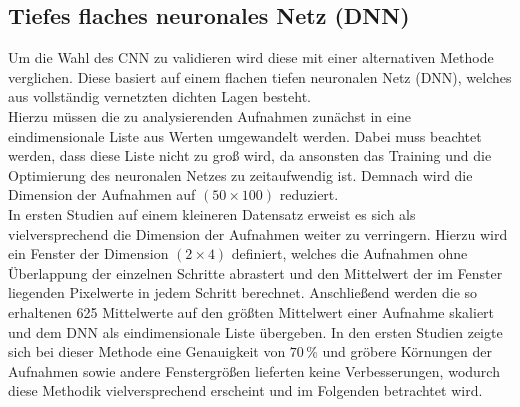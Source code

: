 \subsection{Tiefes flaches neuronales Netz (DNN)}

Um die Wahl des CNN zu validieren wird diese mit einer alternativen Methode verglichen. Diese basiert auf einem flachen tiefen neuronalen Netz (DNN), welches aus vollständig vernetzten dichten Lagen besteht. \\
Hierzu müssen die zu analysierenden Aufnahmen zunächst in eine eindimensionale Liste aus Werten umgewandelt werden. Dabei muss beachtet werden, dass diese Liste nicht zu gro{\ss} wird, da ansonsten das Training und die Optimierung des neuronalen Netzes zu zeitaufwendig ist. Demnach wird die Dimension der Aufnahmen auf $(50\times 100)$ reduziert.\\
In ersten Studien auf einem kleineren Datensatz erweist es sich als vielversprechend die Dimension der Aufnahmen weiter zu verringern. Hierzu wird ein Fenster der Dimension $(2\times 4)$ definiert, welches die Aufnahmen ohne Überlappung der einzelnen Schritte abrastert und den Mittelwert der im Fenster liegenden Pixelwerte in jedem Schritt berechnet. Anschlie{\ss}end werden die so erhaltenen 625 Mittelwerte auf den grö{\ss}ten Mittelwert einer Aufnahme skaliert und dem DNN als eindimensionale Liste übergeben. In den ersten Studien zeigte sich bei dieser Methode eine Genauigkeit von $70\,\%$ und gröbere Körnungen der Aufnahmen sowie andere Fenstergrö{\ss}en lieferten keine Verbesserungen, wodurch diese Methodik vielversprechend erscheint und im Folgenden betrachtet wird. \\
